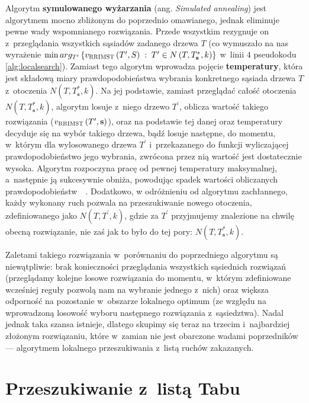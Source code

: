 Algorytm \textbf{symulowanego wyżarzania} (ang. \textit{Simulated annealing}) jest algorytmem mocno zbliżonym do poprzednio omawianego, jednak eliminuje pewne wady wspomnianego rozwiązania. Przede wszystkim rezygnuje on z~przeglądania wszystkich sąsiadów zadanego drzewa $T$ (co wymuszało na nas wyrażenie $\min arg_{T^{\prime}} \left\{ v_{\textsc{RRIMST}} \left( T^{\prime}, S \right) \; : \; T^{\prime} \in N \left( T, T^{\ast}_{\textbf{s}}, k \right) \right\}$ w~linii $4$ pseudokodu \ref{alg:localsearch}). Zamiast tego algorytm wprowadza pojęcie \textbf{temperatury}, która jest składową miary prawdopodobieństwa wybrania konkretnego sąsiada drzewa $T$ z~otoczenia $N \left( T, T^{\ast}_{\textbf{s}}, k \right)$. Na jej podstawie, zamiast przeglądać całość otoczenia $N \left( T, T^{\ast}_{\textbf{s}}, k \right)$, algorytm losuje z~niego drzewo $T^{\prime}$, oblicza wartość takiego rozwiązania ($v_{\textsc{RRIMST}} \left( T^{\prime}, \textbf{s} \right)$), oraz na podstawie tej danej oraz temperatury decyduje się na wybór takiego drzewa, bądź losuje następne, do momentu, w~którym dla wylosowanego drzewa $T^{\prime}$ i~przekazanego do funkcji wyliczającej prawdopodobieństwo jego wybrania, zwrócona przez nią wartość jest dostatecznie wysoka. Algorytm rozpoczyna pracę od pewnej temperatury maksymalnej, a~następnie ją sukcesywnie obniża, powodując spadek wartości obliczanych prawdopodobieństw~\cite{Nikulin2008}~\cite{Jany2015}. Dodatkowo, w odróżnieniu od algorytmu zachłannego, każdy wykonany ruch pozwala na przeszukiwanie nowego otoczenia, zdefiniowanego jako $N \left( T, T^{\prime}, k \right)$, gdzie za $T^{\prime}$ przyjmujemy znalezione na chwilę obecną rozwiązanie, nie zaś jak to było do tej pory: $N \left( T, T^{\ast}_{\textbf{s}}, k \right)$.

Zaletami takiego rozwiązania w~porównaniu do poprzedniego algorytmu są niewątpliwie: brak konieczności przeglądania wszystkich sąsiednich rozwiązań (przeglądamy kolejne losowe rozwiązania do momentu, w~którym zdefiniowane wcześniej reguły pozwolą nam na wybranie jednego z~nich) oraz większa odporność na pozostanie w~obszarze lokalnego optimum (ze względu na wprowadzoną losowość wyboru następnego rozwiązania z~sąsiedztwa). Nadal jednak taka szansa istnieje, dlatego skupimy się teraz na trzecim i~najbardziej złożonym rozwiązaniu, które w~zamian nie jest obarczone wadami poprzedników --- algorytmem lokalnego przeszukiwania z~listą ruchów zakazanych.

\section{Przeszukiwanie z~listą Tabu}

